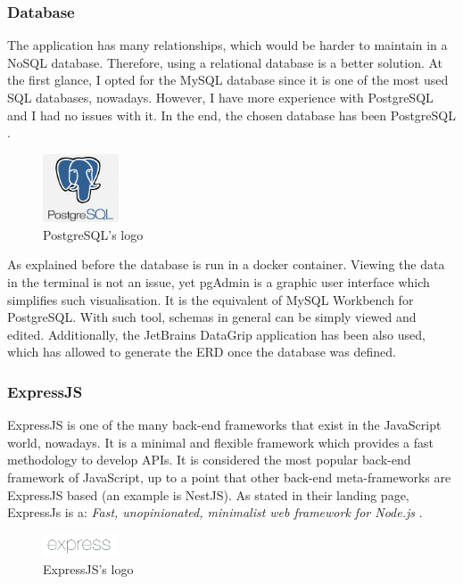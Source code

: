 \documentclass[a4paper, 12pt, oneside]{book}
\begin{document}
\subsubsection{Database}
The application has many relationships, which would be harder to maintain in a NoSQL database. Therefore, using a relational database is a better solution. At the first glance, I opted for the MySQL database since it is one of the most used SQL databases, nowadays. However, I have more experience with PostgreSQL and I had no issues with it. In the end, the chosen database has been PostgreSQL \cite{postgresql}.
\begin{figure}[H]
	\centering
	\includegraphics[width=0.2\textwidth]{assets/postgres-logo.png}
	\caption{PostgreSQL's logo}
\end{figure}
As explained before the database is run in a docker container. Viewing the data in the terminal is not an issue, yet pgAdmin is a graphic user interface which simplifies such visualisation. It is the equivalent of MySQL Workbench for PostgreSQL. With such tool, schemas in general can be simply viewed and edited. Additionally, the JetBrains DataGrip application has been also used, which has allowed to generate the ERD once the database was defined.
\subsubsection{ExpressJS}
ExpressJS is one of the many back-end frameworks that exist in the JavaScript world, nowadays. It is a minimal and flexible framework which provides a fast methodology to develop APIs. It is considered the most popular back-end framework of JavaScript, up to a point that other back-end meta-frameworks are ExpressJS based (an example is NestJS). As stated in their landing page, ExpressJs is a: \emph{Fast, unopinionated, minimalist web framework for Node.js} \cite{expressjs}.
\begin{figure}[H]
	\centering
	\includegraphics[width=0.2\textwidth]{assets/express-logo.png}
	\caption{ExpressJS's logo}
\end{figure}
\end{document}
